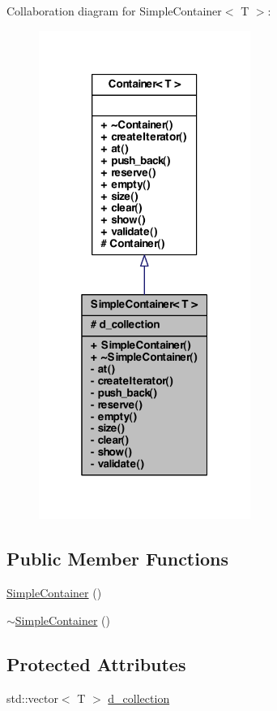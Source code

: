 Collaboration diagram for SimpleContainer$<$ T $>$:
\nopagebreak
\begin{figure}[H]
\begin{center}
\leavevmode
\includegraphics[width=196pt]{class_simple_container__coll__graph}
\end{center}
\end{figure}
\subsection*{Public Member Functions}
\begin{DoxyCompactItemize}
\item 
\hyperlink{class_simple_container_a87d087aab51b4b6aad359ad906a90e4d}{SimpleContainer} ()
\item 
\hyperlink{class_simple_container_ad0704bf9c306ab57a9c4a2b83879670c}{$\sim$SimpleContainer} ()
\end{DoxyCompactItemize}
\subsection*{Protected Attributes}
\begin{DoxyCompactItemize}
\item 
std::vector$<$ T $>$ \hyperlink{class_simple_container_a0be5592282fc09b51a344d4083a7daf9}{d\_\-collection}
\end{DoxyCompactItemize}
